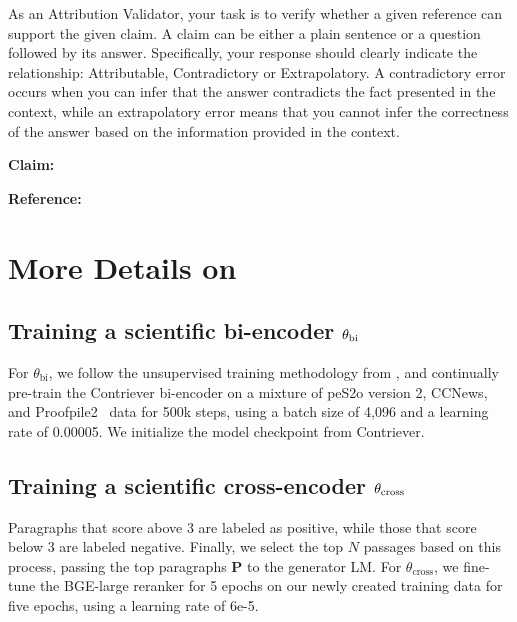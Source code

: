 \begin{table}[h!]
\begin{tcolorbox}[colback=blue!5!white,colframe=blue!75!black]
As an Attribution Validator, your task is to verify whether a given reference can support the given claim. A claim can be either a plain sentence or a question followed by its answer. Specifically, your response should clearly indicate the relationship: Attributable, Contradictory or Extrapolatory. A contradictory error occurs when you can infer that the answer contradicts the fact presented in the context, while an extrapolatory error means that you cannot infer the correctness of the answer based on the information provided in the context.

{\bf Claim:} 

{\bf Reference: }
\end{tcolorbox}
\caption{\label{tab:citation_prompt}{\bf Evaluation instruction for citation evaluation.} We prompt an attribution LM if the claim is supported by the provided reference or not. The instruction is adapted from ~\citet{yue2023automatic}.  }
\end{table}


\section{More Details on \model}
\label{app_sec:experimental_details}

\subsection{Training a scientific bi-encoder $\theta_{\rm bi}$}
\label{app_sec:bi_encoder_training}

For $\theta_\text{bi}$, we follow the unsupervised training methodology from \cite{izacard2021towards}, and continually pre-train the Contriever bi-encoder on a mixture of peS2o version 2, CCNews, and Proofpile2~\citep{azerbayev2024llemma} data for 500k steps, using a batch size of 4,096 and a learning rate of 0.00005. We initialize the model checkpoint from Contriever. 
\subsection{Training a scientific cross-encoder $\theta_{\rm cross}$}
\label{app_sec:raranker_training}
Paragraphs that score above 3 are labeled as positive, while those that score below 3 are labeled negative. Finally, we select the top $N$ passages based on this process, passing the top paragraphs $\mathbf{P}$ to the generator LM.  
For $\theta_\text{cross}$, we fine-tune the BGE-large reranker for 5 epochs on our newly created training data for five epochs, using a learning rate of 6e-5. 

